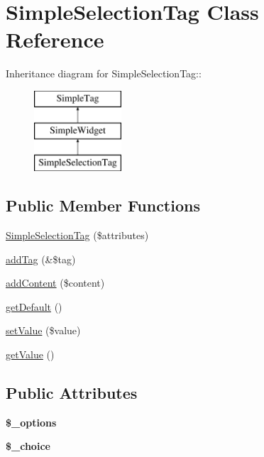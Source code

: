 \hypertarget{class_simple_selection_tag}{
\section{SimpleSelectionTag Class Reference}
\label{class_simple_selection_tag}
}
Inheritance diagram for SimpleSelectionTag::\begin{figure}[H]
\begin{center}
\leavevmode
\includegraphics[height=3cm]{class_simple_selection_tag}
\end{center}
\end{figure}
\subsection*{Public Member Functions}
\begin{DoxyCompactItemize}
\item 
\hyperlink{class_simple_selection_tag_aa82896cb091f3f88898310e5dcfbf446}{SimpleSelectionTag} (\$attributes)
\item 
\hyperlink{class_simple_selection_tag_aa7547a0f3b171987ad686049822a1446}{addTag} (\&\$tag)
\item 
\hyperlink{class_simple_selection_tag_a168eec24b5c2d95c4e7e0eebfca9f4d7}{addContent} (\$content)
\item 
\hyperlink{class_simple_selection_tag_ab515be0efa0968f8e74f3ed2312b3463}{getDefault} ()
\item 
\hyperlink{class_simple_selection_tag_a3cf6ad438463a73871ef02f729a7b25b}{setValue} (\$value)
\item 
\hyperlink{class_simple_selection_tag_a2eb746b2b426205f78ff4eecf6f335a0}{getValue} ()
\end{DoxyCompactItemize}
\subsection*{Public Attributes}
\begin{DoxyCompactItemize}
\item 
\hypertarget{class_simple_selection_tag_a1184ec68dbc76022618a9aabdfece584}{
{\bfseries \$\_\-options}}
\label{class_simple_selection_tag_a1184ec68dbc76022618a9aabdfece584}

\item 
\hypertarget{class_simple_selection_tag_a3f83e9d2c05405e5127256206d353fbc}{
{\bfseries \$\_\-choice}}
\label{class_simple_selection_tag_a3f83e9d2c05405e5127256206d353fbc}

\end{DoxyCompactItemize}



